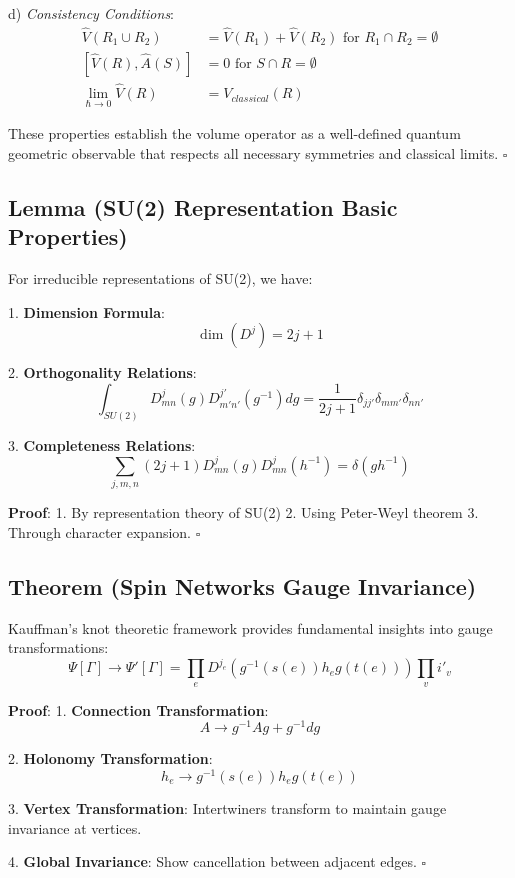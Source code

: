 \documentclass[12pt,a4paper]{article}
\begin{document}
   d) \textit{Consistency Conditions}:
      \[
      \begin{aligned}
      \hat{V}(R_1 \cup R_2) &= \hat{V}(R_1) + \hat{V}(R_2) \text{ for } R_1 \cap R_2 = \emptyset \\
      [\hat{V}(R), \hat{A}(S)] &= 0 \text{ for } S \cap R = \emptyset \\
      \lim_{\hbar \to 0} \hat{V}(R) &= V_{classical}(R)
      \end{aligned}
      \]

These properties establish the volume operator as a well-defined quantum geometric observable that respects all necessary symmetries and classical limits. $\square$

\subsection{Lemma (SU(2) Representation Basic Properties)}
For irreducible representations of SU(2), we have:

1. \textbf{Dimension Formula}:
   \[
   \dim(D^j) = 2j + 1
   \]

2. \textbf{Orthogonality Relations}:
   \[
   \int_{SU(2)} D^j_{mn}(g)D^{j'}_{m'n'}(g^{-1})dg = \frac{1}{2j+1}\delta_{jj'}\delta_{mm'}\delta_{nn'}
   \]

3. \textbf{Completeness Relations}:
   \[
   \sum_{j,m,n} (2j+1)D^j_{mn}(g)D^j_{mn}(h^{-1}) = \delta(gh^{-1})
   \]

\textbf{Proof}:
1. By representation theory of SU(2)
2. Using Peter-Weyl theorem
3. Through character expansion. $\square$

\subsection{Theorem (Spin Networks Gauge Invariance)}
Kauffman's knot theoretic framework\cite{kauffman1991knots} provides fundamental insights into gauge transformations:
\[
\Psi[\Gamma] \rightarrow \Psi'[\Gamma] = \prod_{e} D^{j_e}(g^{-1}(s(e))h_eg(t(e))) \prod_{v} i'_v
\]

\textbf{Proof}:
1. \textbf{Connection Transformation}:
   \[
   A \rightarrow g^{-1}Ag + g^{-1}dg
   \]

2. \textbf{Holonomy Transformation}:
   \[
   h_e \rightarrow g^{-1}(s(e))h_eg(t(e))
   \]

3. \textbf{Vertex Transformation}:
   Intertwiners transform to maintain gauge invariance at vertices.

4. \textbf{Global Invariance}:
   Show cancellation between adjacent edges. $\square$
\end{document}
